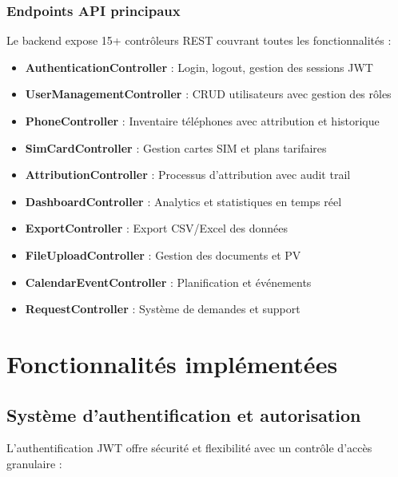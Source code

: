 \documentclass[12pt,a4paper]{report}
\begin{document}
\subsubsection{Endpoints API principaux}
Le backend expose 15+ contrôleurs REST couvrant toutes les fonctionnalités :

\begin{itemize}
\item \textbf{AuthenticationController} : Login, logout, gestion des sessions JWT
\item \textbf{UserManagementController} : CRUD utilisateurs avec gestion des rôles
\item \textbf{PhoneController} : Inventaire téléphones avec attribution et historique
\item \textbf{SimCardController} : Gestion cartes SIM et plans tarifaires
\item \textbf{AttributionController} : Processus d'attribution avec audit trail
\item \textbf{DashboardController} : Analytics et statistiques en temps réel
\item \textbf{ExportController} : Export CSV/Excel des données
\item \textbf{FileUploadController} : Gestion des documents et PV
\item \textbf{CalendarEventController} : Planification et événements
\item \textbf{RequestController} : Système de demandes et support
\end{itemize}

\section{Fonctionnalités implémentées}

\subsection{Système d'authentification et autorisation}

L'authentification JWT offre sécurité et flexibilité avec un contrôle d'accès granulaire :
\end{document}
